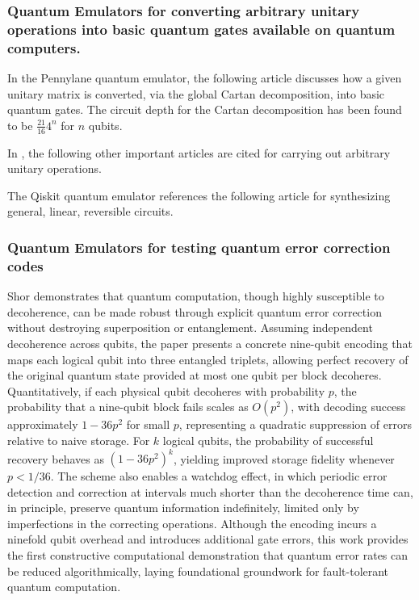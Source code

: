 \documentclass[a4paper,fleqn]{cas-sc}
\begin{document}
\subsubsection{Quantum Emulators for converting arbitrary unitary operations
into basic quantum gates available on quantum computers.}

In the Pennylane quantum emulator, the following article\cite{KAK_pennylane}
discusses how a given unitary matrix is converted, via the
global Cartan 
decomposition\cite{wierichs2025recursivecartandecompositionsunitary},  
into basic quantum 
gates.  The circuit depth for the Cartan decomposition has been found to
be $\frac{21}{16}4^{n}$ for $n$ qubits\cite{Mansky_2023}.

In \cite{KAK_pennylane}, the following other important 
articles\cite{1629135,krol2024quantumshannoncircuitconstruction,K_kc__2022,Da_l__2008}
are cited for carrying out arbitrary unitary operations.

The Qiskit quantum emulator\cite{IBM_platform} 
references the following article for
synthesizing general, linear, reversible circuits\cite{patel2003efficientsynthesislinearreversible}.



\subsubsection{Quantum Emulators for testing quantum error correction codes}

Shor\cite{shor1995scheme} demonstrates that quantum computation, 
though highly susceptible to decoherence, can
be made robust through explicit quantum error correction without 
destroying superposition or
entanglement. Assuming independent decoherence across qubits, 
the paper presents a
concrete nine-qubit encoding that maps each logical qubit into 
three entangled triplets, allowing
perfect recovery of the original quantum state provided 
at most one qubit per block decoheres.
Quantitatively, if each physical qubit decoheres with 
probability $p$, the probability that a
nine-qubit block fails scales as $O(p^{2})$, with decoding 
success approximately $1-36 p^{2}$ for
small $p$, representing a quadratic suppression of errors 
relative to naive storage. For $k$ logical
qubits, the probability of successful recovery behaves 
as $(1-36p^{2})^{k}$, yielding improved
storage fidelity whenever $p<1/36$. The scheme 
also enables a watchdog effect, in which
periodic error detection and correction at intervals much 
shorter than the decoherence time can,
in principle, preserve quantum information 
indefinitely, limited only by imperfections in the
correcting operations. Although the encoding incurs a 
ninefold qubit overhead and introduces
additional gate errors, this work provides the first 
constructive computational demonstration that
quantum error rates can be reduced algorithmically, laying 
foundational groundwork for
fault-tolerant quantum computation.
\end{document}
